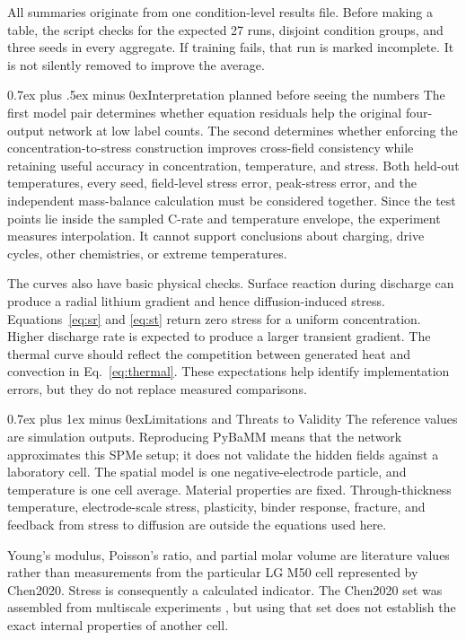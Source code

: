 \documentclass[conference]{IEEEtran}
\makeatletter
\newcommand{\headingfont}{\rmfamily}
\def\section{\@startsection{section}{1}{\z@}{1.5ex plus 1.5ex minus 0.5ex}%
{0.7ex plus 1ex minus 0ex}{\normalfont\headingfont\large\centering\bfseries}}
\def\subsection{\@startsection{subsection}{2}{\z@}{1.5ex plus 1.5ex minus 0.5ex}%
{0.7ex plus .5ex minus 0ex}{\normalfont\headingfont\normalsize\bfseries}}
\makeatother
\begin{document}
All summaries originate from one condition-level results file. Before making a table, the script checks for the expected 27 runs, disjoint condition groups, and three seeds in every aggregate. If training fails, that run is marked incomplete. It is not silently removed to improve the average.

\subsection{Interpretation planned before seeing the numbers}
The first model pair determines whether equation residuals help the original four-output network at low label counts. The second determines whether enforcing the concentration-to-stress construction improves cross-field consistency while retaining useful accuracy in concentration, temperature, and stress. Both held-out temperatures, every seed, field-level stress error, peak-stress error, and the independent mass-balance calculation must be considered together. Since the test points lie inside the sampled C-rate and temperature envelope, the experiment measures interpolation. It cannot support conclusions about charging, drive cycles, other chemistries, or extreme temperatures.

The curves also have basic physical checks. Surface reaction during discharge can produce a radial lithium gradient and hence diffusion-induced stress. Equations~\eqref{eq:sr} and \eqref{eq:st} return zero stress for a uniform concentration. Higher discharge rate is expected to produce a larger transient gradient. The thermal curve should reflect the competition between generated heat and convection in Eq.~\eqref{eq:thermal}. These expectations help identify implementation errors, but they do not replace measured comparisons.

\section{Limitations and Threats to Validity}
The reference values are simulation outputs. Reproducing PyBaMM means that the network approximates this SPMe setup; it does not validate the hidden fields against a laboratory cell. The spatial model is one negative-electrode particle, and temperature is one cell average. Material properties are fixed. Through-thickness temperature, electrode-scale stress, plasticity, binder response, fracture, and feedback from stress to diffusion are outside the equations used here.

Young's modulus, Poisson's ratio, and partial molar volume are literature values rather than measurements from the particular LG M50 cell represented by Chen2020. Stress is consequently a calculated indicator. The Chen2020 set was assembled from multiscale experiments \cite{chen2020parameterization}, but using that set does not establish the exact internal properties of another cell.
\end{document}
